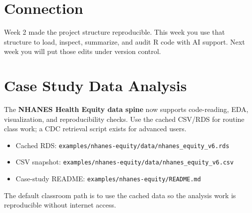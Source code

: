 \documentclass[
  letterpaper,
  DIV=11,
  numbers=noendperiod,
  oneside]{scrreprt}
\providecommand{\tightlist}{%
  \setlength{\itemsep}{0pt}\setlength{\parskip}{0pt}}
\begin{document}
\section*{Connection}\label{connection-2}


Week 2 made the project structure reproducible. This week you use that
structure to load, inspect, summarize, and audit R code with AI support.
Next week you will put those edits under version control.

\section*{Case Study Data Analysis}\label{case-study-data-analysis}


The \textbf{NHANES Health Equity data spine} now supports code-reading,
EDA, visualization, and reproducibility checks. Use the cached CSV/RDS
for routine class work; a CDC retrieval script exists for advanced
users.

\begin{itemize}
\tightlist
\item
  Cached RDS:
  \texttt{examples/nhanes-equity/data/nhanes\_equity\_v6.rds}
\item
  CSV snapshot:
  \texttt{examples/nhanes-equity/data/nhanes\_equity\_v6.csv}
\item
  Case-study README: \texttt{examples/nhanes-equity/README.md}
\end{itemize}

The default classroom path is to use the cached data so the analysis
work is reproducible without internet access.
\end{document}
